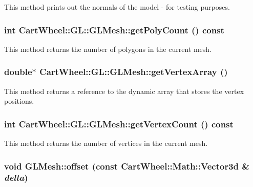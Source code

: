 \label{classCartWheel_1_1GL_1_1GLMesh_ab2a3b84bab3f14733d68da4df2a25e63}
This method prints out the normals of the model -\/ for testing purposes. \hypertarget{classCartWheel_1_1GL_1_1GLMesh_aafcc4fe6b300ff7c7492c75a057710b2}{
\subsubsection[{getPolyCount}]{\setlength{\rightskip}{0pt plus 5cm}int CartWheel::GL::GLMesh::getPolyCount () const}}
\label{classCartWheel_1_1GL_1_1GLMesh_aafcc4fe6b300ff7c7492c75a057710b2}
This method returns the number of polygons in the current mesh. \hypertarget{classCartWheel_1_1GL_1_1GLMesh_aa4bc75290b6a2d716d3994016a33f862}{
\subsubsection[{getVertexArray}]{\setlength{\rightskip}{0pt plus 5cm}double$\ast$ CartWheel::GL::GLMesh::getVertexArray ()}}
\label{classCartWheel_1_1GL_1_1GLMesh_aa4bc75290b6a2d716d3994016a33f862}
This method returns a reference to the dynamic array that stores the vertex positions. \hypertarget{classCartWheel_1_1GL_1_1GLMesh_a3658a0457dd37ecae912fe552c640bc8}{
\subsubsection[{getVertexCount}]{\setlength{\rightskip}{0pt plus 5cm}int CartWheel::GL::GLMesh::getVertexCount () const}}
\label{classCartWheel_1_1GL_1_1GLMesh_a3658a0457dd37ecae912fe552c640bc8}
This method returns the number of vertices in the current mesh. \hypertarget{classCartWheel_1_1GL_1_1GLMesh_a596ecf6cf2ece6422ac23d638170e730}{
\subsubsection[{offset}]{\setlength{\rightskip}{0pt plus 5cm}void GLMesh::offset (const {\bf CartWheel::Math::Vector3d} \& {\em delta})}}
